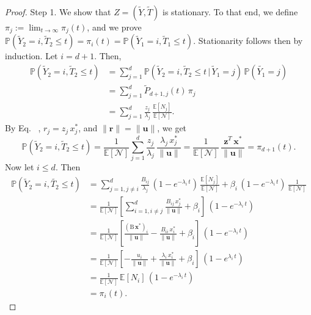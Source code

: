 \documentclass[smallextended]{svjour3}
\makeatletter
\renewcommand*{\eqref}[1]{%
  \hyperref[{#1}]{\textup{\tagform@{\ref*{#1}}}}%
}
\renewcommand{\tens}[1]{\mathrm{#1}}
\renewcommand{\vec}[1]{\mathbf{#1}}
\renewcommand{\P}{\mathbb{P}}
\newcommand{\E}{\mathbb{E}}
\newcommand{\suml}{\sum\limits}
\newcommand{\vnorms}[1]{\|#1\|}
\makeatother
\begin{document}
\begin{proof}
 Step 1. We show that $Z=(\widetilde{Y},\widetilde{T})$ is stationary.
 To that end, we define $\pi_j:=\lim_{t\to\infty} \pi_j(t)$, and we prove $\P(\widetilde{Y}_2=i,\widetilde{T}_2\leq t) = \pi_i(t) = \P(\widetilde{Y}_1=i,\widetilde{T}_1\leq t)$. Stationarity follows then by induction. Let $i=d+1$.
 Then,
\begin{equation}
  \begin{aligned}
    \P(\widetilde{Y}_2=i,\widetilde{T}_2\leq t) &= \suml_{j=1}^d \P(\widetilde{Y}_2=i,\widetilde{T}_2\leq t\,|\,\widetilde{Y}_1=j)\,\P(\widetilde{Y_1}=j)\\
    &= \suml_{j=1}^d \widetilde{P}_{d+1,j}(t)\,\pi_j\\
    &= \suml_{j=1}^d \frac{z_j}{\lambda_j}\,\frac{\E\left[N_j\right]}{\E\left[\mathcal{N}\right]}.
  \end{aligned}
\end{equation}
By Eq.~\eqref{eqn:N_i}, $r_j=z_j\,x^\ast_j$, and $\vnorms{\vec{r}}=\vnorms{\vec{u}}$, we get
\begin{equation}
    \P(\widetilde{Y}_2=i,\widetilde{T}_2\leq t)
    = \frac{1}{\E\left[\mathcal{N}\right]}\suml_{j=1}^d \frac{z_j}{\lambda_j}\,\frac{\lambda_j\,x^\ast_j}{\vnorms{\vec{u}}}
    = \frac{1}{\E\left[\mathcal{N}\right]}\,\frac{\vec{z}^T\,\vec{x}^\ast}{\vnorms{\vec{u}}} = \pi_{d+1}(t).
\end{equation}
Now let $i\leq d$.
Then
\begin{equation}
 \begin{aligned}
  \P(\widetilde{Y}_2=i,\widetilde{T_2}\leq t)
  &= \suml_{j=1,j\neq i}^d \frac{B_{ij}}{\lambda_j}\,(1-e^{-\lambda_i\,t})\,\frac{\E\left[N_j\right]}{\E\left[\mathcal{N}\right]} + \beta_i\,(1-e^{-\lambda_i\,t})\,\frac{1}{\E\left[\mathcal{N}\right]}\\
  &= \frac{1}{\E\left[\mathcal{N}\right]} \left[\suml_{i=1,i\neq j}^d \frac{B_{ij}\,x^\ast_j}{\vnorms{\vec{u}}} + \beta_i\right]\,(1-e^{-\lambda_i\,t})\\
  &= \frac{1}{\E\left[\mathcal{N}\right]} \left[\frac{(\tens{B}\,\vec{x}^\ast)_i}{\vnorms{\vec{u}}} - \frac{B_{ii}\,x^\ast_i}{\vnorms{\vec{u}}} + \beta_i\right]\,(1-e^{-\lambda_i\,t})\\
  &= \frac{1}{\E\left[\mathcal{N}\right]}\left[-\frac{u_i}{\vnorms{\vec{u}}} + \frac{\lambda_i\,x^\ast_i}{\vnorms{\vec{u}}} + \beta_i\right]\,(1-e^{\lambda_i\,t})\\
  &= \frac{1}{\E\left[\mathcal{N}\right]}\,\E\left[N_i\right]\,(1-e^{-\lambda_i\,t})\\
  &= \pi_i(t).
 \end{aligned}
\end{equation} 


\end{proof}
\end{document}
